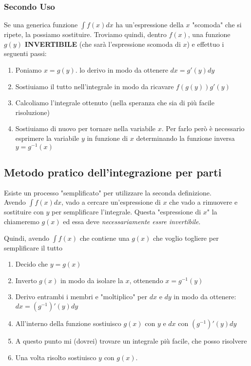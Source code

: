 \subsubsection*{Secondo Uso}
Se una generica funzione $\int f(x) dx$ ha un'espressione della $x$ "scomoda" che si ripete, la possiamo sostituire.
Troviamo quindi, dentro $f(x)$, una funzione $g(y)$ \textbf{INVERTIBILE} (che sarà l'espressione scomoda di $x$) e effettuo i seguenti passi:


\begin{enumerate}
	\item Poniamo $x=g(y)$. lo derivo in modo da ottenere $dx=g'(y)dy$
	\item Sostiuiamo il tutto nell'integrale in modo da ricavare $f(g(y))g'(y)$
	\item Calcoliamo l'integrale ottenuto (nella speranza che sia di più facile risoluzione)
	\item Sostiuiamo di nuovo per tornare nella variabile $x$. Per farlo però è necessario esprimere la variabile $y$ in funzione di $x$ determinando la funzione inversa $y=g^{-1}(x)$
\end{enumerate}

\subsection{Metodo pratico dell'integrazione per parti}
Esiste un processo "semplificato" per utilizzare la seconda definizione.
\\Avendo $\int f(x) dx$, vado a cercare un'espressione di $x$ che vado a rimuovere e sostituire con $y$ per semplificare l'integrale.
Questa "espressione di $x$" la chiameremo $g(x)$ ed essa deve \emph{necessariamente essre invertibile}.

Quindi, avendo $\int f(x)$ che contiene una $g(x)$ che voglio togliere per semplificare il tutto
\begin{enumerate}
	\item Decido che $y=g(x)$
	\item Inverto $g(x)$ in modo da isolare la $x$, ottenendo $x=g^{-1}(y)$
	\item Derivo entrambi i membri e "moltiplico" per $dx$ e $dy$ in modo da ottenere: $dx=(g^{-1})'(y)dy$
	\item All'interno della funzione sostiuisco $g(x)$ con $y$ e $dx$ con $(g^{-1})'(y)dy$
	\item A questo punto mi (dovrei) trovare un integrale più facile, che posso risolvere
	\item Una volta risolto sostiuisco $y$ con $g(x)$.
\end{enumerate}

